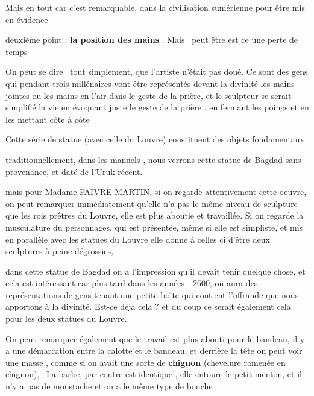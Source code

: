 \documentclass[a4paper]{article}
\begin{document}
{
Mais en tout car c'est remarquable, dans la civilisation sumérienne pour
être mis en évidence}


\bigskip


\bigskip

{
deuxième point : \textbf{la position des mains} . Mais \ peut être est
ce une perte de temps}

{
On peut se dire \ tout simplement, que l'artiste n'était pas doué. Ce
sont des gens qui pendant trois millénaires vont être représentés
devant la divinité les mains jointes ou les mains en l'air dans le
geste de la prière, et le sculpteur se serait simplifié la vie en
évoquant juste le geste de la prière , en fermant les poings et en les
mettant côte à côte}

{
Cette série de statue (avec celle du Louvre) constituent des objets
fondamentaux}


\bigskip

{
traditionnellement, dans les manuels , nous verrons cette statue de
Bagdad sans provenance, et daté de l'Uruk récent.}

{
mais pour Madame FAIVRE MARTIN, si on regarde attentivement cette
oeuvre, on peut remarquer immédiatement qu'elle n'a pas le même niveau
de sculpture que les rois prêtres du Louvre, elle est plus aboutie et
travaillée. Si on regarde la musculature du personnages, qui est
présentée, même si elle est simpliste, et mis en parallèle avec les
statues du Louvre elle donne à celles ci d'être deux sculptures à peine
dégrossies, \ }

{
dans cette statue de Bagdad on a l'impression qu'il devait tenir quelque
chose, et cela est intéressant car plus tard dans les années - 2600, on
aura des représentations de gens tenant une petite boîte qui contient
l'offrande que nous apportons à la divinité. Est-ce déjà cela ? et du
coup ce serait également cela pour les deux statues du Louvre.}


\bigskip


\bigskip


\bigskip

{
On peut remarquer également que le travail est plus abouti pour le
bandeau, il y a une démarcation entre la calotte et le bandeau, et
derrière la tête on peut voir une masse , comme si on avait une sorte
de \textbf{chignon }(chevelure ramenée en chignon), \ La barbe, par
contre est identique , elle entoure le petit menton, et il n'y a pas de
moustache et on a le même type de bouche}
\end{document}
